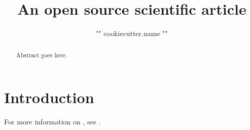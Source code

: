 \documentclass[twocolumn]{aastex631}
\begin{document}
\title{An open source scientific article}

\author{{ "{" }}{{ cookiecutter.name }}{{ "}" }}

\begin{abstract}
    Abstract goes here.
\end{abstract}

\section{Introduction}
\label{sec:intro}

For more information on \showyourwork, see \citet{Luger2021}.


\end{document}
